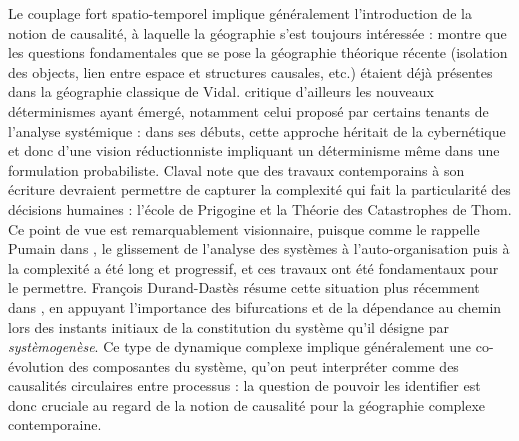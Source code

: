 \documentclass[english]{./sageo}
\begin{document}
Le couplage fort spatio-temporel implique généralement l'introduction de la notion de causalité, à laquelle la géographie s'est toujours intéressée : \cite{loi1985etude} montre que les questions fondamentales que se pose la géographie théorique récente (isolation des objects, lien entre espace et structures causales, etc.) étaient déjà présentes dans la géographie classique de Vidal. \cite{claval1985causalite} critique d'ailleurs les nouveaux déterminismes ayant émergé, notamment celui proposé par certains tenants de l'analyse systémique : dans ses débuts, cette approche héritait de la cybernétique et donc d'une vision réductionniste impliquant un déterminisme même dans une formulation probabiliste. Claval note que des travaux contemporains à son écriture devraient permettre de capturer la complexité qui fait la particularité des décisions humaines : l'école de Prigogine et la Théorie des Catastrophes de Thom. Ce point de vue est remarquablement visionnaire, puisque comme le rappelle Pumain dans \cite{pumain2003approche}, le glissement de l'analyse des systèmes à l'auto-organisation puis à la complexité a été long et progressif, et ces travaux ont été fondamentaux pour le permettre. François Durand-Dastès résume cette situation plus récemment dans \cite{durand2003geographes}, en appuyant l'importance des bifurcations et de la dépendance au chemin lors des instants initiaux de la constitution du système qu'il désigne par \emph{systèmogenèse}. Ce type de dynamique complexe implique généralement une co-évolution des composantes du système, qu'on peut interpréter comme des causalités circulaires entre processus : la question de pouvoir les identifier est donc cruciale au regard de la notion de causalité pour la géographie complexe contemporaine.
\end{document}
